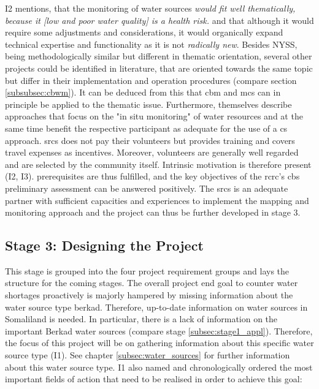 I2 mentions, that the monitoring of water sources \textit{would fit well thematically, because it [low and poor water quality] is a health risk.} and that although it would require some adjustments and considerations, it would organically expand technical expertise and functionality as it is not \textit{radically new}. Besides NYSS, being methodologically similar but different in thematic orientation, several other projects could be identified in literature, that are oriented towards the same topic but differ in their implementation and operation procedures (compare section \ref*{subsubsec:cbwm}). It can be deduced from this that \acrshort{cbm} and \acrshort{mcs} can in principle be applied to the thematic issue. Furthermore, \autocite{fraislCitizenScienceEnvironmental2022} themselves describe approaches that focus on the "in situ monitoring" of water resources and at the same time benefit the respective participant as adequate for the use of a \acrlong{cs} approach. \acrshort{srcs} does not pay their volunteers but provides training and covers travel expenses as incentives. Moreover, volunteers are generally well regarded and are selected by the community itself. Intrinsic motivation is therefore present (I2, I3).\newline
\autocite{fraislCitizenScienceEnvironmental2022} prerequisites are thus fulfilled, and the key objectives of the \acrshort{rcrc}'s \acrshort{cbs} preliminary assessment can be answered positively. The \acrshort{srcs} is an adequate partner with sufficient capacities and experiences to implement the mapping and monitoring approach and the project can thus be further developed in stage 3. 

\subsection{Stage 3: Designing the Project}\label{subsec:stage3_appl}

This stage is grouped into the four project requirement groups and lays the structure for the coming stages. The overall project end goal to counter water shortages proactively is majorly hampered by missing information about the water source type berkad. Therefore, up-to-date information on water sources in Somaliland is needed. In particular, there is a lack of information on the important Berkad water sources (compare stage \ref*{subsec:stage1_appl}). Therefore, the focus of this project will be on gathering information about this specific water source type (I1). See chapter \ref*{subsec:water_sources} for further information about this water source type. I1 also named and chronologically ordered the most important fields of action that need to be realised in order to achieve this goal:

